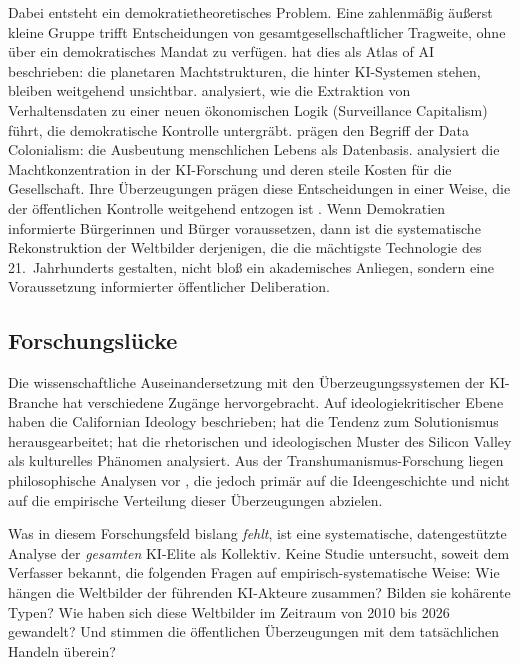 \documentclass[12pt,a4paper]{article}
\begin{document}
Dabei entsteht ein demokratietheoretisches Problem. Eine zahlenm\"a\ss{}ig \"au\ss{}erst kleine Gruppe trifft Entscheidungen von gesamtgesellschaftlicher Tragweite, ohne \"uber ein demokratisches Mandat zu verf\"ugen. \citet{Crawford2021} hat dies als \glqq Atlas of AI\grqq{} beschrieben: die planetaren Machtstrukturen, die hinter KI-Systemen stehen, bleiben weitgehend unsichtbar. \citet{Zuboff2019} analysiert, wie die Extraktion von Verhaltensdaten zu einer neuen \"okonomischen Logik (\glqq Surveillance Capitalism\grqq{}) f\"uhrt, die demokratische Kontrolle untergr\"abt. \citet{Couldry2019} pr\"agen den Begriff der \glqq Data Colonialism\grqq{}: die Ausbeutung menschlichen Lebens als Datenbasis. \citet{Whittaker2021} analysiert die Machtkonzentration in der KI-Forschung und deren \glqq steile Kosten\grqq{} f\"ur die Gesellschaft. Ihre \"Uberzeugungen pr\"agen diese Entscheidungen in einer Weise, die der \"offentlichen Kontrolle weitgehend entzogen ist \citep{Floridi2019, Floridi2023}. Wenn Demokratien informierte B\"urgerinnen und B\"urger voraussetzen, dann ist die systematische Rekonstruktion der Weltbilder derjenigen, die die m\"achtigste Technologie des 21.~Jahrhunderts gestalten, nicht blo\ss{} ein akademisches Anliegen, sondern eine Voraussetzung informierter \"offentlicher Deliberation.


\subsection{Forschungsl\"ucke}
\label{sec:einleitung:luecke}

Die wissenschaftliche Auseinandersetzung mit den \"Uberzeugungssystemen der KI-Branche hat verschiedene Zug\"ange hervorgebracht. Auf ideologiekritischer Ebene haben \citet{BarbCam1996} die \glqq Californian Ideology\grqq{} beschrieben; \citet{Morozov2013} hat die Tendenz zum Solutionismus herausgearbeitet; \citet{Daub2020} hat die rhetorischen und ideologischen Muster des Silicon Valley als kulturelles Ph\"anomen analysiert. Aus der Transhumanismus-Forschung liegen philosophische Analysen vor \citep{Bostrom2005, MoreVitaMore2013, Coeckelbergh2020}, die jedoch prim\"ar auf die Ideengeschichte und nicht auf die empirische Verteilung dieser \"Uberzeugungen abzielen.

Was in diesem Forschungsfeld bislang \emph{fehlt}, ist eine systematische, datengest\"utzte Analyse der \emph{gesamten} KI-Elite als Kollektiv. Keine Studie untersucht, soweit dem Verfasser bekannt, die folgenden Fragen auf empirisch-systematische Weise: Wie h\"angen die Weltbilder der f\"uhrenden KI-Akteure zusammen? Bilden sie koh\"arente Typen? Wie haben sich diese Weltbilder im Zeitraum von 2010 bis 2026 gewandelt? Und stimmen die \"offentlichen \"Uberzeugungen mit dem tats\"achlichen Handeln \"uberein?
\end{document}
